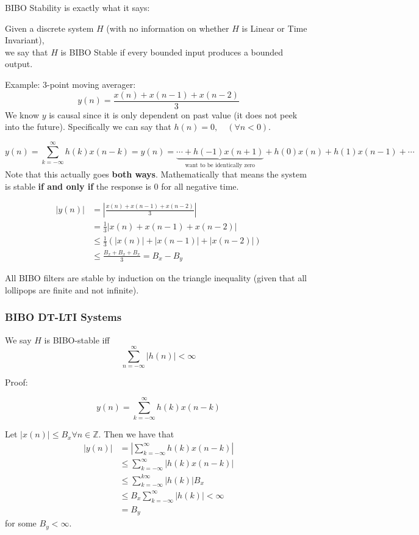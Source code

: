 BIBO Stability is exactly what it says:

Given a discrete system $H$ (with no information on whether $H$ is Linear or Time Invariant),\\ 
we say that $H$ is BIBO Stable if every bounded input produces a bounded output.

Example: 3-point moving averager:
\[
    y(n) = \frac{x(n)+x(n-1)+x(n-2)}3
\]
We know $y$ is causal since it is only dependent on past value (it does not peek into the future). Specifically we can say that $h(n)=0,\quad(\forall n < 0)$.

\[
    y(n)
    = \sum_{k=-\infty}^\infty h(k)x(n-k)
    =y(n)=\underbrace{\cdots +h(-1) x(n+1)}_{\text{want to be identically zero}}+h(0) x(n)+h(1) x(n-1)+\cdots
\]
Note that this actually goes \textbf{both ways}. Mathematically that means the system is stable \textbf{if and only if} the response is 0 for all negative time.

\begin{align*}
    |y(n)|
    &= \left|\frac{x(n)+x(n-1)+x(n-2)}3\right|
    \\
    &= \frac13\left|x(n)+x(n-1)+x(n-2)\right|
    \\
    &\le \frac13\left(|x(n)|+|x(n-1)|+|x(n-2)|\right)
    \\
    &\le \frac{B_x+B_x+B_x}3=B_x-B_y
\end{align*}

All BIBO filters are stable by induction on the triangle inequality (given that all lollipops are finite and not infinite).

\subsubsection{BIBO DT-LTI Systems}
We say $H$ is BIBO-stable iff $$\sum_{n=-\infty}^\infty |h(n)| <\infty$$

Proof:
\begin{shaded}
\[
y(n)=\sum_{k=-\infty}^{\infty} h(k) x(n-k)
\]

Let $|x(n)| \leq B_x \forall n \in \mathbb{Z}$. Then we have that
\begin{align*}
|y(n)| &=\left|\sum_{k=-\infty}^{\infty} h(k) x(n-k)\right| \\
& \leq \sum_{k=-\infty}^{\infty}|h(k) x(n-k)| \\
& \leq \sum_{k=-\infty}^{k \infty}|h(k)| B_x \\
& \leq B_x \sum_{k=-\infty}^{\infty}|h(k)|<\infty \\
&=B_y
\end{align*}
for some $B_y<\infty$.
\end{shaded}
